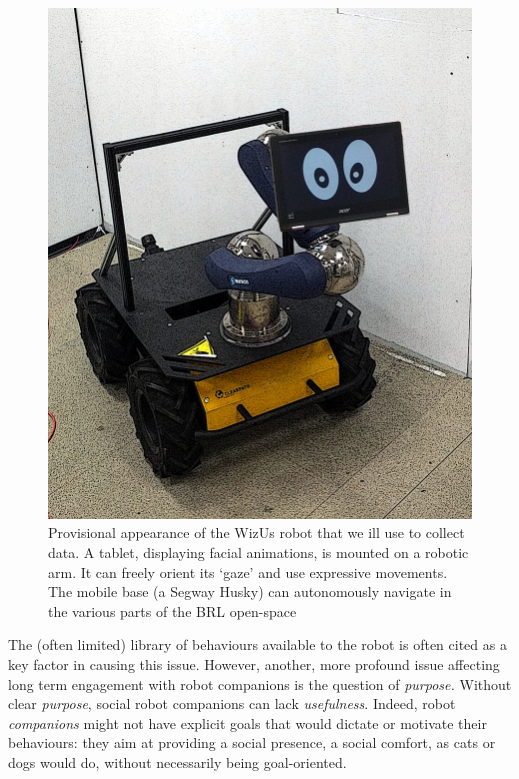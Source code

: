 \documentclass[11pt]{report}
\newcommand{\project}{WizUs\xspace}
\begin{document}
\begin{figure}
    \centering
    \includegraphics[width=0.5\paperwidth]{figs/husky.jpg}
    \caption{\label{fig:robot}
    Provisional appearance of the \project robot that we ill use to collect
    data. A tablet, displaying facial animations, is mounted on a robotic arm.
    It can freely orient its `gaze' and use expressive movements. The mobile
    base (a Segway Husky) can autonomously navigate in the various parts of the
    BRL open-space}
\end{figure}

The (often limited) library of behaviours available to the robot is
often cited as a key factor in causing this issue. However, another,
more profound issue affecting long term engagement with robot companions
is the question of \emph{purpose.} Without clear \emph{purpose}, social
robot companions can lack \emph{usefulness}. Indeed, robot
\emph{companions} might not have explicit goals that would dictate or
motivate their behaviours: they aim at providing a social presence, a
social comfort, as cats or dogs would do, without necessarily being
goal-oriented.
\end{document}
